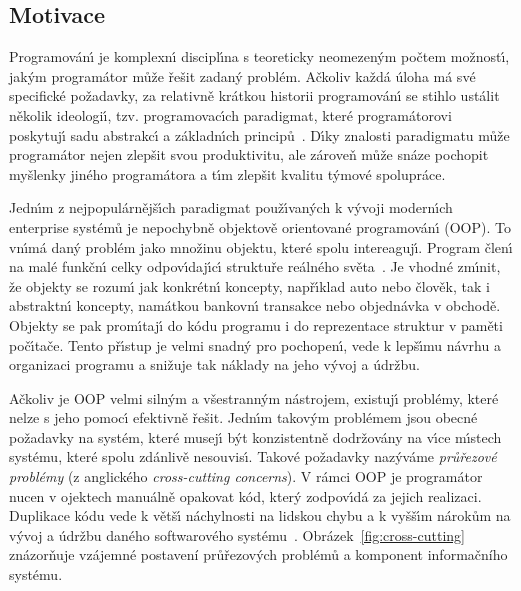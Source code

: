 \subsection{Motivace}

Programován\'{\i} je komplexn\'{\i} discipl\'{\i}na s teoreticky
neomezen\'ym počtem možnost\'{\i}, jak\'ym programátor může
řešit zadan\'y problém. Ačkoliv každá úloha má své specifické
požadavky, za relativně krátkou historii programován\'{\i} se
stihlo ustálit několik ideologi\'{\i}, tzv. programovac\'{\i}ch
paradigmat, které programátorovi poskytuj\'{\i} sadu abstrakc\'{\i}
a základn\'{\i}ch principů~\cite{van2009programming}.
D\'{\i}ky znalosti paradigmatu může programátor nejen zlepšit
svou produktivitu, ale zároveň může snáze pochopit myšlenky
jiného programátora a t\'{\i}m zlepšit kvalitu t\'ymové spolupráce.

Jedn\'{\i}m z nejpopulárnějš\'{\i}ch paradigmat použ\'{\i}van\'ych k
v\'yvoji modern\'{\i}ch enterprise systémů je nepochybně
objektově orientované programován\'{\i} (\gls{OOP}). To vn\'{\i}má dan\'y problém
jako množinu objektu, které spolu intereaguj\'{\i}. Program
člen\'{\i} na malé funkčn\'{\i} celky odpov\'{\i}daj\'{\i}c\'{\i} struktuře
reálného světa~\cite{rentsch1982object}. Je vhodné zm\'{\i}nit,
že objekty se rozum\'{\i} jak konkrétn\'{\i} koncepty, např\'{\i}klad
auto nebo člověk, tak i abstraktn\'{\i} koncepty,
namátkou bankovn\'{\i} transakce nebo objednávka v obchodě.
Objekty se pak prom\'{\i}taj\'{\i} do kódu programu i do
reprezentace struktur v paměti poč\'{\i}tače.
Tento př\'{\i}stup je velmi snadn\'y pro pochopen\'{\i},
vede k lepš\'{\i}mu návrhu a organizaci programu a snižuje
tak náklady na jeho v\'yvoj a údržbu.

Ačkoliv je \gls{OOP} velmi siln\'ym a všestrann\'ym nástrojem,
existuj\'{\i} problémy, které nelze s jeho pomoc\'{\i} efektivně řešit.
Jedn\'{\i}m takov\'ym problémem jsou obecné požadavky na systém,
které musej\'{\i} b\'yt konzistentně dodržovány na v\'{\i}ce
m\'{\i}stech systému, které spolu zdánlivě nesouvis\'{\i}.
Takové požadavky naz\'yváme \textit{průřezové problémy}
(z anglického \textit{cross-cutting concerns}).
V rámci \gls{OOP} je programátor nucen v ojektech manuálně opakovat
kód, kter\'y zodpov\'{\i}dá za jejich realizaci. Duplikace kódu
vede k větš\'{\i} náchylnosti na lidskou chybu a k vyšš\'{\i}m nárokům na v\'yvoj
a údržbu daného softwarového systému~\cite{fowler1999refactoring}.
Obrázek~\ref{fig:cross-cutting} znázorňuje vzájemné postavení průřezových
problémů a komponent informačního systému.

